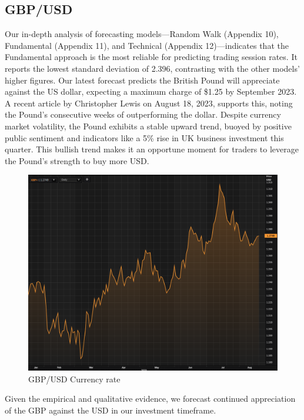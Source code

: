 \documentclass{article}
\let\Oldsubsection\subsection
\renewcommand{\subsection}{\FloatBarrier\Oldsubsection}
\begin{document}
\subsection*{GBP/USD}
Our in-depth analysis of forecasting models—Random Walk (Appendix 10), Fundamental (Appendix 11), and Technical (Appendix 12)—indicates that the Fundamental approach is the most reliable for predicting trading session rates. It reports the lowest standard deviation of 2.396, contrasting with the other models' higher figures. Our latest forecast predicts the British Pound will appreciate against the US dollar, expecting a maximum charge of \$1.25 by September 2023.
\noindent A recent article by Christopher Lewis on August 18, 2023, supports this, noting the Pound's consecutive weeks of outperforming the dollar. Despite currency market volatility, the Pound exhibits a stable upward trend, buoyed by positive public sentiment and indicators like a 5\% rise in UK business investment this quarter. This bullish trend makes it an opportune moment for traders to leverage the Pound's strength to buy more USD.
\begin{figure}[h!]
    \centering
    \includegraphics[scale=0.35]{graphs/GBP-SpotRate.png}
    \caption{GBP/USD Currency rate}
    \label{GBP/USD Currency rate}
\end{figure}

\FloatBarrier

\noindent Given the empirical and qualitative evidence, we forecast continued appreciation of the GBP against the USD in our investment timeframe.
\end{document}
